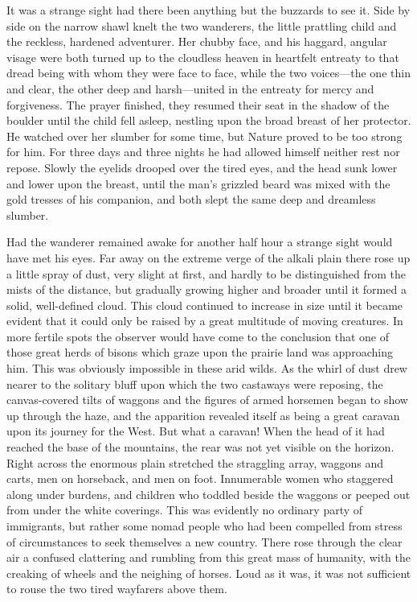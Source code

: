 \documentclass[12pt,english,oneside]{book}
\newcommand{\mdsh}[1]{\mbox{#1}\linebreak[1]}
\begin{document}
It was a strange sight had there been anything but the buzzards to
see it. Side by side on the narrow shawl knelt the two wanderers,
the little prattling child and the reckless, hardened adventurer.
Her chubby face, and his haggard, angular visage were both turned
up to the cloudless heaven in heartfelt entreaty to that dread being
with whom they were face to face, while the two voices\mdsh{---}the
one thin and clear, the other deep and harsh\mdsh{---}united in the
entreaty for mercy and forgiveness. The prayer finished, they resumed
their seat in the shadow of the boulder until the child fell asleep,
nestling upon the broad breast of her protector. He watched over her
slumber for some time, but Nature proved to be too strong for him.
For three days and three nights he had allowed himself neither rest
nor repose. Slowly the eyelids drooped over the tired eyes, and the
head sunk lower and lower upon the breast, until the man's grizzled
beard was mixed with the gold tresses of his companion, and both slept
the same deep and dreamless slumber.

Had the wanderer remained awake for another half hour a strange sight
would have met his eyes. Far away on the extreme verge of the alkali
plain there rose up a little spray of dust, very slight at first,
and hardly to be distinguished from the mists of the distance, but
gradually growing higher and broader until it formed a solid, well-defined
cloud. This cloud continued to increase in size until it became evident
that it could only be raised by a great multitude of moving creatures.
In more fertile spots the observer would have come to the conclusion
that one of those great herds of bisons which graze upon the prairie
land was approaching him. This was obviously impossible in these arid
wilds. As the whirl of dust drew nearer to the solitary bluff upon
which the two castaways were reposing, the canvas-covered tilts of
waggons and the figures of armed horsemen began to show up through
the haze, and the apparition revealed itself as being a great caravan
upon its journey for the West. But what a caravan! When the head of
it had reached the base of the mountains, the rear was not yet visible
on the horizon. Right across the enormous plain stretched the straggling
array, waggons and carts, men on horseback, and men on foot. Innumerable
women who staggered along under burdens, and children who toddled
beside the waggons or peeped out from under the white coverings. This
was evidently no ordinary party of immigrants, but rather some nomad
people who had been compelled from stress of circumstances to seek
themselves a new country. There rose through the clear air a confused
clattering and rumbling from this great mass of humanity, with the
creaking of wheels and the neighing of horses. Loud as it was, it
was not sufficient to rouse the two tired wayfarers above them.
\end{document}
